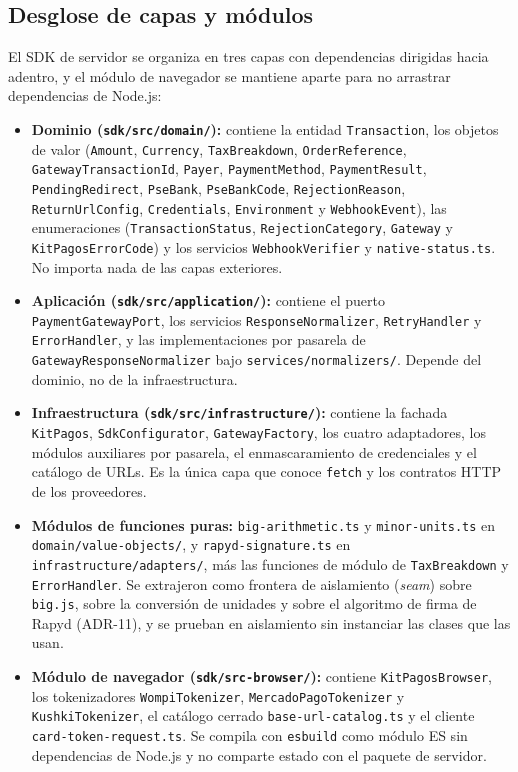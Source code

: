 \subsection{Desglose de capas y módulos}
El SDK de servidor se organiza en tres capas con dependencias dirigidas hacia adentro, y el módulo de navegador se mantiene aparte para no arrastrar dependencias de Node.js:

\begin{itemize}\sloppy
  \item \textbf{Dominio (\texttt{sdk/src/domain/}):} contiene la entidad \texttt{Transaction}, los objetos de valor (\texttt{Amount}, \texttt{Currency}, \texttt{TaxBreakdown}, \texttt{OrderReference}, \texttt{GatewayTransactionId}, \texttt{Payer}, \texttt{PaymentMethod}, \texttt{PaymentResult}, \texttt{PendingRedirect}, \texttt{PseBank}, \texttt{PseBankCode}, \texttt{RejectionReason}, \texttt{ReturnUrlConfig}, \texttt{Credentials}, \texttt{Environment} y \texttt{WebhookEvent}), las enumeraciones (\texttt{TransactionStatus}, \texttt{RejectionCategory}, \texttt{Gateway} y \texttt{KitPagosErrorCode}) y los servicios \texttt{WebhookVerifier} y \texttt{native-status.ts}. No importa nada de las capas exteriores.
  \item \textbf{Aplicación (\texttt{sdk/src/application/}):} contiene el puerto \texttt{PaymentGatewayPort}, los servicios \texttt{ResponseNormalizer}, \texttt{RetryHandler} y \texttt{ErrorHandler}, y las implementaciones por pasarela de \texttt{GatewayResponseNormalizer} bajo \texttt{services/normalizers/}. Depende del dominio, no de la infraestructura.
  \item \textbf{Infraestructura (\texttt{sdk/src/infrastructure/}):} contiene la fachada \texttt{KitPagos}, \texttt{SdkConfigurator}, \texttt{GatewayFactory}, los cuatro adaptadores, los módulos auxiliares por pasarela, el enmascaramiento de credenciales y el catálogo de URLs. Es la única capa que conoce \texttt{fetch} y los contratos HTTP de los proveedores.
  \item \textbf{Módulos de funciones puras:} \texttt{big-arithmetic.ts} y \texttt{minor-units.ts} en \texttt{domain/value-objects/}, y \texttt{rapyd-signature.ts} en \texttt{infrastructure/adapters/}, más las funciones de módulo de \texttt{TaxBreakdown} y \texttt{ErrorHandler}. Se extrajeron como frontera de aislamiento (\textit{seam}) sobre \texttt{big.js}, sobre la conversión de unidades y sobre el algoritmo de firma de Rapyd (ADR-11), y se prueban en aislamiento sin instanciar las clases que las usan.
  \item \textbf{Módulo de navegador (\texttt{sdk/src-browser/}):} contiene \texttt{KitPagosBrowser}, los tokenizadores \texttt{WompiTokenizer}, \texttt{MercadoPagoTokenizer} y \texttt{KushkiTokenizer}, el catálogo cerrado \texttt{base-url-catalog.ts} y el cliente \texttt{card-token-request.ts}. Se compila con \texttt{esbuild} como módulo ES sin dependencias de Node.js y no comparte estado con el paquete de servidor.

\end{itemize}
